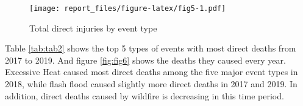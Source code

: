 \documentclass[
]{article}
\newenvironment{Shaded}{\begin{snugshade}}{\end{snugshade}}
\newcommand{\DataTypeTok}[1]{\textcolor[rgb]{0.13,0.29,0.53}{#1}}
\newcommand{\DecValTok}[1]{\textcolor[rgb]{0.00,0.00,0.81}{#1}}
\newcommand{\KeywordTok}[1]{\textcolor[rgb]{0.13,0.29,0.53}{\textbf{#1}}}
\newcommand{\NormalTok}[1]{#1}
\newcommand{\OperatorTok}[1]{\textcolor[rgb]{0.81,0.36,0.00}{\textbf{#1}}}
\newcommand{\OtherTok}[1]{\textcolor[rgb]{0.56,0.35,0.01}{#1}}
\newcommand{\StringTok}[1]{\textcolor[rgb]{0.31,0.60,0.02}{#1}}
\begin{document}
\begin{Shaded}
\end{Shaded}

\begin{figure}
\centering
\texttt{[image: report\_files/figure-latex/fig5-1.pdf]}
\caption{\label{fig:fig5}Total direct injuries by event type}
\end{figure}

\clearpage

Table \ref{tab:tab2} shows the top 5 types of events with most direct deaths from 2017 to 2019. And figure \ref{fig:fig6} shows the deaths they caused every year. Excessive Heat caused most direct deaths among the five major event types in 2018, while flash flood caused slightly more direct deaths in 2017 and 2019. In addition, direct deaths caused by wildfire is decreasing in this time period.
\end{document}
